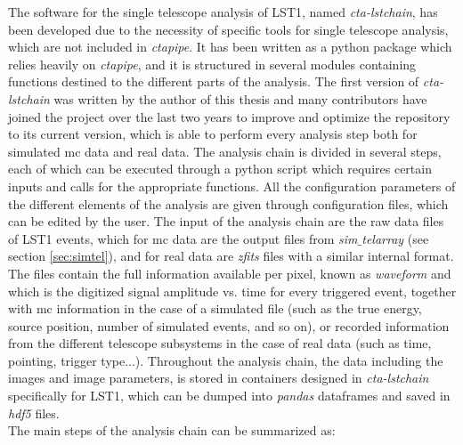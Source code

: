 \documentclass[main.tex]{subfiles}
\begin{document}
The software for the single telescope analysis of LST1, named \textit{cta-lstchain}, has been developed due to the necessity of specific tools for single telescope analysis, which are not included in \textit{ctapipe}. It has been written as a python package which relies heavily on \textit{ctapipe}, and it is structured in several modules containing functions destined to the different parts of the analysis. The first version of \textit{cta-lstchain} was written by the author of this thesis and many contributors have joined the project over the last two years to improve and optimize the repository to its current version, which is able to perform every analysis step both for simulated \gls{mc} data and real data. The analysis chain is divided in several steps, each of which can be executed through a python script which requires certain inputs and calls for the appropriate functions. All the configuration parameters of the different elements of the analysis are given through configuration files, which can be edited by the user. The input of the analysis chain are the raw data files of LST1 events, which for \gls{mc} data are the output files from \textit{sim$\_$telarray} (see section \ref{sec:simtel}), and for real data are \textit{zfits} files with a similar internal format. The files contain the full information available per pixel, known as \textit{waveform} and which is the digitized signal amplitude vs. time for every triggered event, together with \gls{mc} information in the case of a simulated file (such as the true energy, source position, number of simulated events, and so on), or recorded information from the different telescope subsystems in the case of real data (such as time, pointing, trigger type...). Throughout the analysis chain, the data including the images and image parameters, is stored in containers designed in \textit{cta-lstchain} specifically for LST1, which can be dumped into \textit{pandas} dataframes and saved in \textit{hdf5} files.\\
The main steps of the analysis chain can be summarized as:
\end{document}
